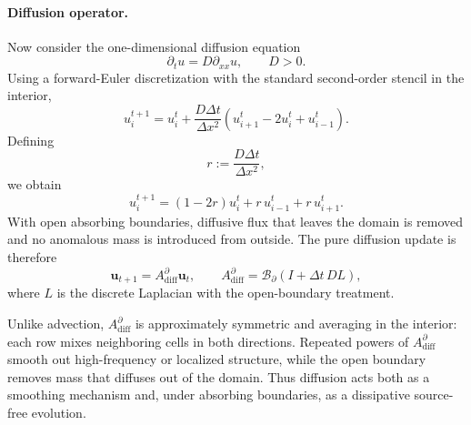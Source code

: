 \paragraph{Diffusion operator.}
Now consider the one-dimensional diffusion equation
\begin{equation}
\partial_t u = D \partial_{xx} u,
\qquad D>0. \nonumber
\end{equation}
Using a forward-Euler discretization with the standard second-order stencil in the interior,
\begin{equation}
u_i^{t+1}
=
u_i^t + \frac{D\Delta t}{\Delta x^2}(u_{i+1}^t - 2u_i^t + u_{i-1}^t). \nonumber
\end{equation}
Defining
\begin{equation}
r := \frac{D\Delta t}{\Delta x^2}, \nonumber
\end{equation}
we obtain
\begin{equation}
u_i^{t+1} = (1-2r)u_i^t + r\,u_{i-1}^t + r\,u_{i+1}^t. \nonumber
\end{equation}
With open absorbing boundaries, diffusive flux that leaves the domain is removed and no anomalous mass is introduced from outside. The pure diffusion update is therefore
\begin{equation}
\mathbf{u}_{t+1}
=
A_{\mathrm{diff}}^{\partial}\mathbf{u}_t,
\qquad
A_{\mathrm{diff}}^{\partial}
=
\mathcal{B}_{\partial}
\left(I+\Delta t\,D L\right),
\label{eq:Adiff_def}
\end{equation}
where $L$ is the discrete Laplacian with the open-boundary treatment.

Unlike advection, $A_{\mathrm{diff}}^{\partial}$ is approximately symmetric and averaging in the interior: each row mixes neighboring cells in both directions. Repeated powers of $A_{\mathrm{diff}}^{\partial}$ smooth out high-frequency or localized structure, while the open boundary removes mass that diffuses out of the domain. Thus diffusion acts both as a smoothing mechanism and, under absorbing boundaries, as a dissipative source-free evolution.

